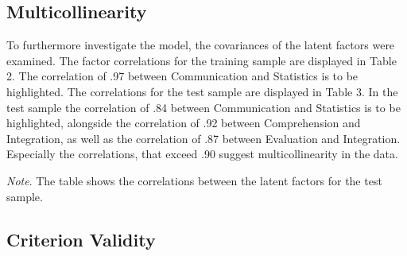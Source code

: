 \documentclass[
  12pt,
  a4paper,
  twoside]{article}
\begin{document}
\subsection{Multicollinearity}\label{multicollinearity}

To furthermore investigate the model, the covariances of the latent factors were examined. The factor correlations for the training sample are displayed in Table 2. The correlation of .97 between Communication and Statistics is to be highlighted. The correlations for the test sample are displayed in Table 3. In the test sample the correlation of .84 between Communication and Statistics is to be highlighted, alongside the correlation of .92 between Comprehension and Integration, as well as the correlation of .87 between Evaluation and Integration. Especially the correlations, that exceed .90 suggest multicollinearity in the data.

\begin{table}[htpb]
\caption{Latent Factor correlations test sample}


\vspace{10pt}  %
\small\textit{Note}. The table shows the correlations between the latent factors for the test sample.
\end{table}

\subsection{Criterion Validity}\label{criterion-validity}
\end{document}
